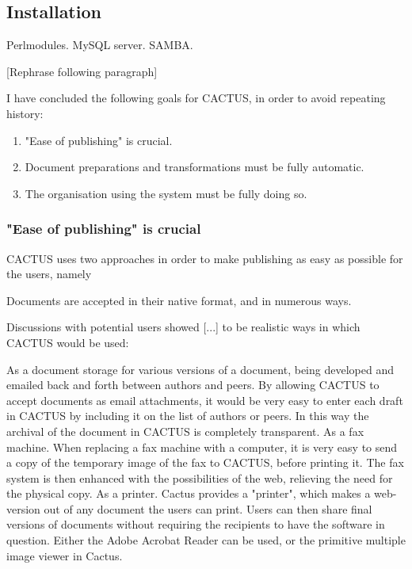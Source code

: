 \subsection{Installation}
Perlmodules.  MySQL server. SAMBA.


[Rephrase following paragraph]

I have concluded the following goals for CACTUS, in order to
avoid repeating history:

\begin{enumerate}
\item "Ease of publishing" is crucial.
  
\item Document preparations and transformations must be
  fully automatic.
  
\item The organisation using the system must be fully doing
  so.

\end{enumerate}

\subsubsection{"Ease of publishing" is crucial}

CACTUS uses two approaches in order to make publishing as
easy as possible for the users, namely

\begin{center}
  Documents are accepted in their native format, and in
  numerous ways.
\end{center}

Discussions with potential users showed [...] to be
realistic ways in which CACTUS would be used:

As a document storage for various versions of a document,
being developed and emailed back and forth between authors
and peers.  By allowing CACTUS to accept documents as email
attachments, it would be very easy to enter each draft in
CACTUS by including it on the list of authors or peers.  In
this way the archival of the document in CACTUS is
completely transparent.  As a fax machine.  When replacing a
fax machine with a computer, it is very easy to send a copy
of the temporary image of the fax to CACTUS, before printing
it.  The fax system is then enhanced with the possibilities
of the web, relieving the need for the physical copy.  As a
printer.  Cactus provides a "printer", which makes a
web-version out of any document the users can print.  Users
can then share final versions of documents without requiring
the recipients to have the software in question.  Either the
Adobe Acrobat Reader can be used, or the primitive multiple
image viewer in Cactus.

